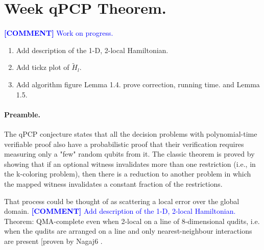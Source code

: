 \documentclass{article}
\begin{document}
\newcommand{\commentt}[1]{\textcolor{blue}{ \textbf{[COMMENT]} #1}}
\newcommand{\ctt}[1]{\commentt{#1}}
\newcommand{\prb}[1]{ \mathbf{Pr} \left[ {#1} \right]}
\newcommand{\onotation}[1]{\(\mathcal{O} \left( {#1}  \right) \)}
\newcommand{\ona}[1]{\onotation{#1}}

\newcommand{\GG}{\tilde{G} }
\newcommand{\TGG}{\(\tilde{G}\) }
\newcommand{\Prb}[1]{ \mathbf{Pr}\left[ {#1} \right] }
\renewcommand\qedsymbol{$\blacksquare$}

\newcommand{\Htr}[1]{\tilde{H}_{#1}}
\newcommand{\Ht}{\Htr{l}}
\newcommand{\Htp}[2]{ \Htr{#1}\left(\ket{#2}\right)  }
\newcommand{\ps}{\ket{\psi}}
\newcommand{\hpst}{\left( H, \ps \right)}
\newcommand{\Ham}{Hamiltonian }
\section{Week qPCP Theorem.}

\paragraph{} \ctt{Work on progress.} 
\begin{enumerate}
    \item Add description of the 1-D, 2-local Hamiltonian.
    \item Add tickz plot of \(\Ht\).
    \item Add algorithm figure Lemma 1.4. prove correction, running time. and Lemma 1.5.  
\end{enumerate}

\paragraph{Preamble.} The qPCP conjecture states that all the decision problems with polynomial-time verifiable proof also have a probabilistic proof that their verification requires measuring only a "few" random qubits from it. The classic theorem is proved by showing that if an optional witness invalidates more than one restriction (i.e., in the k-coloring problem), then there is a reduction to another problem in which the mapped witness invalidates a constant fraction of the restrictions. 

That process could be thought of as scattering a local error over the global domain.
\ctt{Add description of the 1-D, 2-local Hamiltonian.  }
Theorem: QMA-complete even when 2-local on a line of 8-dimensional qudits, i.e. when the
qudits are arranged on a line and only nearest-neighbour interactions are present [proven by Nagaj6 \cite{hallgren2013local}.
\end{document}
